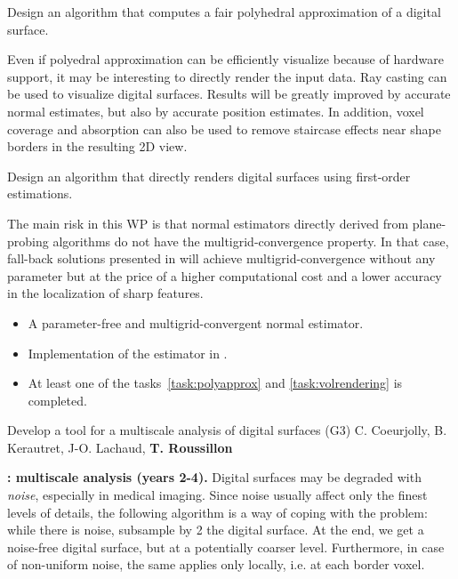 \begin{Task}
  \label{task:polyapprox}
  Design an algorithm that computes a fair polyhedral approximation of a digital surface. 
\end{Task}

Even if polyedral approximation can be efficiently visualize because of hardware support,
it may be interesting to directly render the input data. Ray casting can be used to
visualize digital surfaces. Results will be greatly improved by accurate normal estimates,
but also by accurate position estimates. In addition, voxel coverage and absorption can
also be used to remove staircase effects near shape borders in the resulting 2D view.

\begin{Task}
  \label{task:volrendering}
  Design an algorithm that directly renders digital surfaces using first-order estimations.  
\end{Task}

\Risks
The main risk in this WP is that normal estimators
directly derived from plane-probing algorithms do not have the multigrid-convergence
property. In that case, fall-back solutions presented in  will achieve
multigrid-convergence without any parameter but at the price of a higher computational
cost and a lower accuracy in the localization of sharp features. 

\Success
\begin{itemize}
  \item A parameter-free and multigrid-convergent normal estimator.
  \item Implementation of the estimator in \DGtal.
  \item At least one of the tasks~\ref{task:polyapprox} and \ref{task:volrendering} is completed. 
\end{itemize}

\newpage

   {Develop a tool for a multiscale analysis of digital surfaces (G3)}
   {C. Coeurjolly, B. Kerautret, J-O. Lachaud, \textbf{T. Roussillon}}
\medskip

\noindent\textbf{\wpScale: multiscale analysis (years 2-4).} Digital surfaces may be degraded with \emph{noise}, especially in medical imaging. Since noise usually affect only the finest levels of details, the following algorithm is a way of coping with the problem: while there is noise, subsample by 2 the digital surface. At the end, we get a noise-free digital surface, but at a potentially coarser level. Furthermore, in case of non-uniform noise, the same applies only locally, i.e. at each border voxel.  

